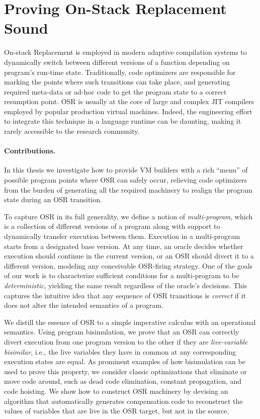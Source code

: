 \section{Proving On-Stack Replacement Sound}

On-stack Replacement is employed in modern adaptive compilation systems to dynamically switch between different versions of a function depending on program's run-time state. Traditionally, code optimizers are responsible for marking the points where such transitions can take place, and generating required meta-data or ad-hoc code to get the program state to a correct resumption point. OSR is usually at the core of large and complex JIT compilers employed by popular production virtual machines. Indeed, the engineering effort to integrate this technique in a language runtime can be daunting, making it rarely accessible to the research community.

\paragraph*{Contributions.} In this thesis we investigate how to provide VM builders with a rich ``menu'' of possible program points where OSR can safely occur, relieving code optimizers from the burden of generating all the required machinery to realign the program state during an OSR transition.

To capture OSR in its full generality, we define a notion of {\em multi-program}, which is a collection of different versions of a program along with support to dynamically transfer execution between them. Execution in a multi-program starts from a designated base version. At any time, an oracle decides whether execution should continue in the current version, or an OSR should divert it to a different version, modeling any conceivable OSR-firing strategy. One of the goals of our work is to characterize sufficient conditions for a multi-program to be {\em deterministic}, yielding the same result regardless of the oracle's decisions. This captures the intuitive idea that any sequence of OSR transitions is {\em correct} if it does not alter the intended semantics of a program.

We distill the essence of OSR to a simple imperative calculus with an operational semantics. Using program bisimulation, we prove that an OSR can correctly divert execution from one program version to the other if they are {\em live-variable bisimilar}, i.e., the live variables they have in common at any corresponding execution states are equal. As prominent examples of how bisimulation can be used to prove this property, we consider classic optimizations that eliminate or move code around, such as dead code elimination, constant propagation, and code hoisting. We show how to construct OSR machinery by devising an algorithm that automatically generates compensation code to reconstruct the values of variables that are live in the OSR target, but not in the source.


